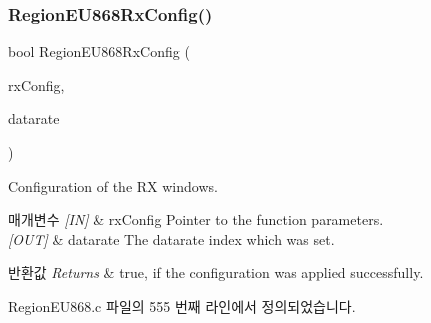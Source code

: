 \subsubsection{\texorpdfstring{Region\+E\+U868\+Rx\+Config()}{RegionEU868RxConfig()}}
{\footnotesize\ttfamily bool Region\+E\+U868\+Rx\+Config (\begin{DoxyParamCaption}\item[{\mbox{\hyperlink{group___r_e_g_i_o_n_ga375c038078dfcfc7ef14280021db719e}{Rx\+Config\+Params\+\_\+t}} $\ast$}]{rx\+Config,  }\item[{int8\+\_\+t $\ast$}]{datarate }\end{DoxyParamCaption})}



Configuration of the RX windows. 


\begin{DoxyParams}{매개변수}
{\em \mbox{[}\+I\+N\mbox{]}} & rx\+Config Pointer to the function parameters.\\
\hline
{\em \mbox{[}\+O\+U\+T\mbox{]}} & datarate The datarate index which was set.\\
\hline
\end{DoxyParams}

\begin{DoxyRetVals}{반환값}
{\em Returns} & true, if the configuration was applied successfully. \\
\hline
\end{DoxyRetVals}


Region\+E\+U868.\+c 파일의 555 번째 라인에서 정의되었습니다.


